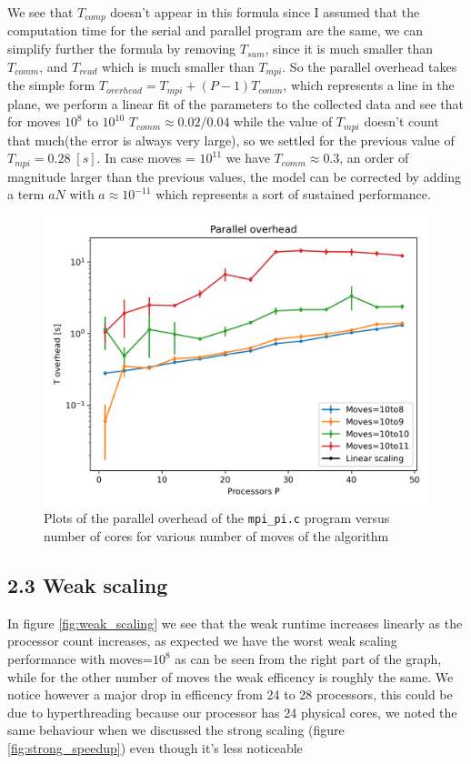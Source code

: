\documentclass[a4paper]{article}
\begin{document}
We see that $T_{comp}$ doesn't appear in this formula since I assumed that the computation time for the serial and parallel program are the same, we can simplify further the formula by removing $T_{sum}$, since it is much smaller than $T_{comm}$, and $T_{read}$ which is much smaller than $T_{mpi}$. So the parallel overhead takes the simple form $T_{overhead} = T_{mpi} + (P-1)T_{comm}$, which represents a line in the plane, we perform a linear fit of the parameters to the collected data and see that for moves $10^8$ to $10^{10}$ $T_{comm}\approx 0.02/0.04$ while the value of $T_{mpi}$ doesn't count that much(the error is always very large), so we settled for the previous value of $T_{mpi}=0.28 \; [s]$. In case moves = $10^{11}$ we have $T_{comm}\approx 0.3$, an order of magnitude larger than the previous values, the model can be corrected by adding a term $aN$ with $a\approx 10^{-11}$ which represents a sort of sustained performance.

\begin{figure}[h]
    \centering
    \includegraphics[scale=0.7]{parallel_overhead_time.png}
    \caption{Plots of the parallel overhead of the \texttt{mpi\_pi.c} program versus number of cores for various number of moves of the algorithm}
    \label{fig:parallel_overhead_time}
\end{figure}

\subsection*{2.3 Weak scaling}
In figure \ref{fig:weak_scaling} we see that the weak runtime increases linearly as the processor count increases, as expected we have the worst weak scaling performance with moves=$10^8$ as can be seen from the right part of the graph, while for the other number of moves the weak efficency is roughly the same. We notice however a major drop in efficency from 24 to 28 processors, this could be due to hyperthreading because our processor has 24 physical cores, we noted the same behaviour when we discussed the strong scaling (figure \ref{fig:strong_speedup}) even though it's less noticeable
\end{document}
